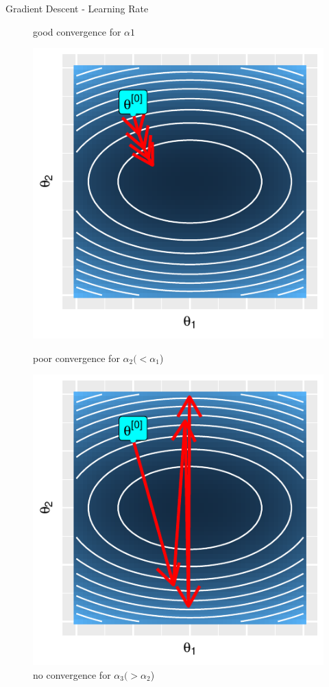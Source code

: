 \documentclass[11pt,compress,t,notes=noshow, xcolor=table]{beamer}
\begin{document}
\begin{vbframe}{Gradient Descent - Learning Rate}
\begin{figure}[!htb]
  \caption*{\tiny good convergence for $\alpha1$}
\endminipage\hfill
{}
  \includegraphics[width=\linewidth]{figure/grad_desc_alpha2}
  \caption*{\tiny poor convergence for $\alpha_2 (< \alpha_1$)}
\endminipage\hfill
{}%
  \includegraphics[width=\linewidth]{figure/grad_desc_alpha3}
  \caption*{\tiny no convergence for $\alpha_3 (> \alpha_2$)}
\endminipage
\end{figure}

\end{vbframe}
\end{document}
